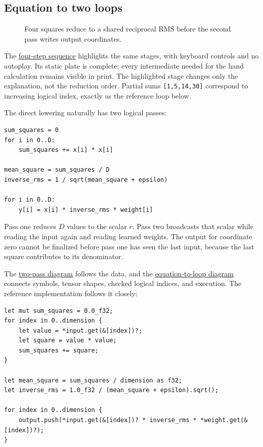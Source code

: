 \documentclass[
  10pt,
]{article}
\begin{document}
\subsection{Equation to two loops}\label{equation-to-two-loops}

\begin{figure}[H]\centering\resizebox{\linewidth}{!}{}\caption{Four squares reduce to a shared reciprocal RMS before the second pass writes output coordinates.}\end{figure}

The
\href{https://github.com/hermonai/inside-the-llm-engine/blob/astra-visual-rewrite/figures/generated/ch07-passes.html}{four-step
sequence} highlights the same stages, with keyboard controls and no
autoplay. Its static plate is complete: every intermediate needed for
the hand calculation remains visible in print. The highlighted stage
changes only the explanation, not the reduction order. Partial sums
\texttt{{[}1,5,14,30{]}} correspond to increasing logical index, exactly
as the reference loop below.

The direct lowering naturally has two logical passes:

\begin{verbatim}
sum_squares = 0
for i in 0..D:
    sum_squares += x[i] * x[i]

mean_square = sum_squares / D
inverse_rms = 1 / sqrt(mean_square + epsilon)

for i in 0..D:
    y[i] = x[i] * inverse_rms * weight[i]
\end{verbatim}

Pass one reduces \(D\) values to the scalar \(r\). Pass two broadcasts
that scalar while reading the input again and reading learned weights.
The output for coordinate zero cannot be finalized before pass one has
seen the last input, because the last square contributes to its
denominator.

The
\href{https://github.com/hermonai/inside-the-llm-engine/blob/astra-visual-rewrite/diagrams/transformer/rmsnorm-two-pass.txt}{two-pass
diagram} follows the data, and the
\href{https://github.com/hermonai/inside-the-llm-engine/blob/astra-visual-rewrite/diagrams/transformer/equation-to-loop.txt}{equation-to-loop
diagram} connects symbols, tensor shapes, checked logical indices, and
execution. The reference implementation follows it closely:


\begin{verbatim}
let mut sum_squares = 0.0_f32;
for index in 0..dimension {
    let value = *input.get(&[index])?;
    let square = value * value;
    sum_squares += square;
}

let mean_square = sum_squares / dimension as f32;
let inverse_rms = 1.0_f32 / (mean_square + epsilon).sqrt();

for index in 0..dimension {
    output.push(*input.get(&[index])? * inverse_rms * *weight.get(&[index])?);
}
\end{verbatim}
\end{document}
